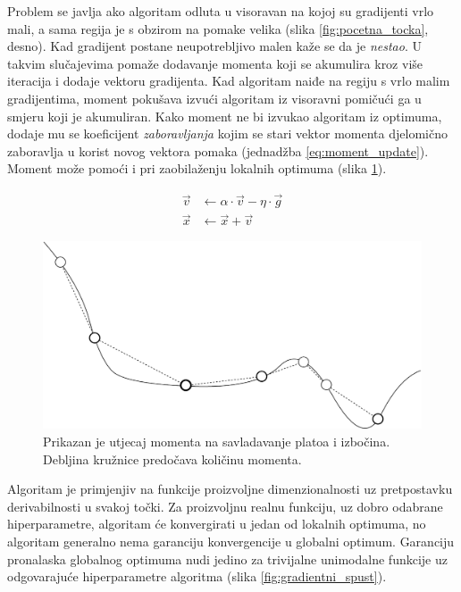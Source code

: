 \documentclass[times, utf8, numeric, diplomski]{fer}
\def\figref#1{(slika \ref{#1})}
\begin{document}
Problem se javlja ako algoritam odluta u visoravan na kojoj su gradijenti vrlo mali, a sama regija je s obzirom na pomake velika (slika \ref{fig:pocetna_tocka}, desno). Kad gradijent postane neupotrebljivo malen kaže se da je \textit{nestao}. U takvim slučajevima pomaže dodavanje momenta koji se akumulira kroz više iteracija i dodaje vektoru gradijenta. Kad algoritam naiđe na regiju s vrlo malim gradijentima, moment pokušava izvući algoritam iz visoravni pomičući ga u smjeru koji je akumuliran. Kako moment ne bi izvukao algoritam iz optimuma, dodaje mu se koeficijent \textit{zaboravljanja} kojim se stari vektor momenta djelomično zaboravlja u korist novog vektora pomaka (jednadžba \ref{eq:moment_update}). Moment može pomoći i pri zaobilaženju lokalnih optimuma \figref{fig:visoravan}.

\begin{equation}
\label{eq:moment_update}
\begin{split}
\vec{v} &\gets \alpha \cdot \vec{v} - \eta \cdot \vec{g} \\
\vec{x} &\gets \vec{x} + \vec{v}
\end{split}
\end{equation}

\begin{figure}[H]
\centering
\includegraphics[scale=0.6]{grad_descent_moment.pdf}
\caption{Prikazan je utjecaj momenta na savladavanje platoa i izbočina. Debljina kružnice predočava količinu momenta.}
\label{fig:visoravan}
\end{figure}

Algoritam je primjenjiv na funkcije proizvoljne dimenzionalnosti uz pretpostavku derivabilnosti u svakoj točki. Za proizvoljnu realnu funkciju, uz dobro odabrane hiperparametre, algoritam će konvergirati u jedan od lokalnih optimuma, no algoritam generalno nema garanciju konvergencije u globalni optimum. Garanciju pronalaska globalnog optimuma nudi jedino za trivijalne unimodalne funkcije uz odgovarajuće hiperparametre algoritma \figref{fig:gradientni_spust}.
\end{document}
